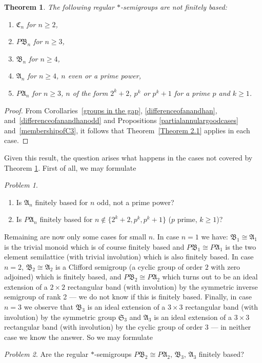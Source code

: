 \documentclass[11pt,reqno]{amsart}
\numberwithin{equation}{section}
\newtheorem{Thm}{Theorem}[section]
\theoremstyle{remark}
\newtheorem{Problem}{Problem}[section]
\def\A{\mathfrak{A}}
\def\C{\mathfrak{C}}
\def\B{\mathfrak{B}}
\def\Sim{\mathfrak{S}}
\begin{document}
\begin{Thm}
\label{mainresultpartitionsemigroups} The following regular
$*$-semigroups are not finitely based:
\begin{enumerate}
\item $\C_n$  for $n\ge 2$,
\item $P\B_n$ for $n\ge 3$,
\item $\B_n$ for $n\ge 4$,
\item $\A_n$ for $n\ge 4$, $n$ even or a prime power,
\item $P\A_n$ for $n\ge 3$, $n$ of the form $2^k+2$, $p^k$ or $p^k+1$ for
a  prime $p$ and $k\ge 1$.
\end{enumerate}
\end{Thm}

\begin{proof}
From Corollaries~\ref{groups in the gap},
\ref{differenceofanandhan}, and~\ref{differenceofanandhanodd} and
Propositions \ref{partialannulargoodcases}
and~\ref{membershipofC3}, it follows that Theorem~\ref{Theorem
2.1} applies in each case.
\end{proof}

Given this result, the question arises what happens in the cases
not covered by Theorem \ref{mainresultpartitionsemigroups}. First
of all, we may formulate
\begin{Problem}
\begin{enumerate}
\item  Is $\A_n$ finitely based for $n$ odd, not a prime power?
\item Is $P\A_n$ finitely based for $n\notin\{2^k+2,p^k,p^k+1\}$
($p$  prime, $k\ge 1$)?
\end{enumerate}
\end{Problem}

Remaining are now only some cases for small $n$. In case $n=1$ we
have: $\B_1\cong \A_1$ is the trivial monoid which is of course
finitely based and $P\B_1\cong P\A_1$ is the two element
semilattice (with trivial involution) which is also finitely
based. In case $n=2$, $\B_2\cong \A_2$ is a Clifford semigroup (a
cyclic group of order $2$ with zero adjoined) which is finitely
based, and $P\B_2\cong P\A_2$ which turns out to be an ideal
extension of a $2\times 2$ rectangular band (with involution) by
the symmetric inverse semigroup of rank 2 --- we do not know if
this is finitely based. Finally, in case $n=3$ we observe that
$\B_3$ is an ideal extension of a $3\times 3$ rectangular band
(with involution) by the symmetric group $\Sim_3$ and $\A_3$ is an
ideal extension of a $3\times 3$ rectangular band (with
involution) by the cyclic group of order $3$ --- in neither case
we know the answer.  So we may formulate
\begin{Problem}
Are the regular $*$-semigroups $P\B_2\cong P\A_2$, $\B_3$, $\A_3$
finitely based?
\end{Problem}
\end{document}
